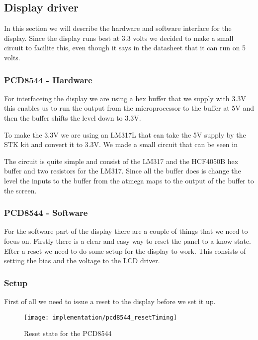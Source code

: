 \subsection{Display driver}
In this section we will describe the hardware and software interface for the display.
Since the display runs best at 3.3 volts we decided to make a small circuit to facilite this,
even though it says in the datasheet\cite[p. 17]{philips:pcd8544} that it can run on 5 volts.

\subsubsection{PCD8544 - Hardware}
For interfaceing the display we are using a hex buffer that we supply with 3.3V this enables us to run the output from the
microprocessor to the buffer at 5V and then the buffer shifts the level down to 3.3V\cite[p. 1]{STMicroelectronics:HCF4050B}.

To make the 3.3V we are using an LM317L that can take the 5V supply by the STK kit and convert it to 3.3V.
We made a small circuit that can be seen in


The circuit is quite simple and consist of the LM317 and the HCF4050B hex buffer and two resistors for the LM317.
Since all the buffer does is change the level the inputs to the buffer from the atmega maps to the output of the buffer to the screen.


\subsubsection{PCD8544 - Software}
For the software part of the display there are a couple of things that we need to focus on.
Firstly there is a clear and easy way to reset the panel to a know state. Efter a reset we need to do some setup for the display to work.
This consists of setting the bias and the voltage to the LCD driver.

\subsubsection{Setup}
First of all we need to issue a reset to the display before we set it up.

\begin{figure}
	\centering
	\texttt{[image: implementation/pcd8544\_resetTiming]}
	\caption{Reset state for the PCD8544\cite[p. 21]{philips:pcd8544}}
	\label{fig:pcd8544_resetTiming}
\end{figure}

